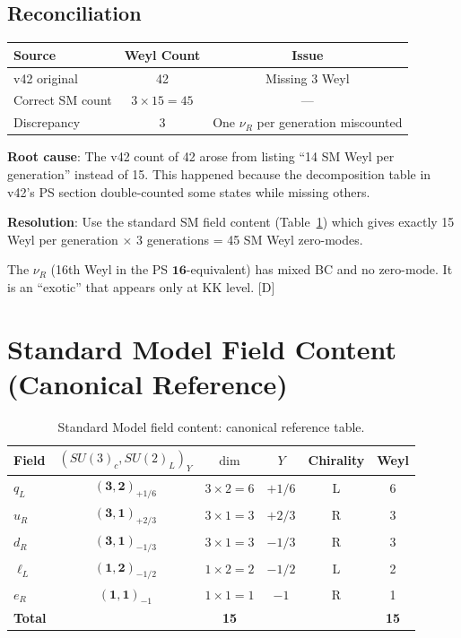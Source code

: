 \documentclass[11pt,a4paper]{article}
\newcommand{\tagD}{\textcolor{blue!70!black}{[D]}}
\begin{document}
\subsection{Reconciliation}

\begin{resultbox}[42 $\to$ 45 Reconciliation]
\begin{center}
\begin{tabular}{lcc}
\toprule
Source & Weyl Count & Issue \\
\midrule
v42 original & 42 & Missing 3 Weyl \\
Correct SM count & $3 \times 15 = 45$ & --- \\
\midrule
Discrepancy & 3 & One $\nu_R$ per generation miscounted \\
\bottomrule
\end{tabular}
\end{center}

\textbf{Root cause}: The v42 count of 42 arose from listing ``14 SM Weyl per generation''
instead of 15. This happened because the decomposition table in v42's PS section
double-counted some states while missing others.

\textbf{Resolution}: Use the standard SM field content (Table~\ref{tab:sm-fields-standard})
which gives exactly 15 Weyl per generation $\times$ 3 generations = 45 SM Weyl zero-modes.

The $\nu_R$ (16th Weyl in the PS $\mathbf{16}$-equivalent) has mixed BC and no zero-mode.
It is an ``exotic'' that appears only at KK level.
\tagD
\end{resultbox}

\section{Standard Model Field Content (Canonical Reference)}
\label{sec:sm-canonical}

\begin{table}[h]
\centering
\caption{Standard Model field content: canonical reference table.}
\label{tab:sm-fields-standard}
\begin{tabular}{lccccc}
\toprule
Field & $(SU(3)_c, SU(2)_L)_Y$ & $\dim$ & $Y$ & Chirality & Weyl \\
\midrule
$q_L$ & $(\mathbf{3}, \mathbf{2})_{+1/6}$ & $3 \times 2 = 6$ & $+1/6$ & L & 6 \\
$u_R$ & $(\mathbf{3}, \mathbf{1})_{+2/3}$ & $3 \times 1 = 3$ & $+2/3$ & R & 3 \\
$d_R$ & $(\mathbf{3}, \mathbf{1})_{-1/3}$ & $3 \times 1 = 3$ & $-1/3$ & R & 3 \\
$\ell_L$ & $(\mathbf{1}, \mathbf{2})_{-1/2}$ & $1 \times 2 = 2$ & $-1/2$ & L & 2 \\
$e_R$ & $(\mathbf{1}, \mathbf{1})_{-1}$ & $1 \times 1 = 1$ & $-1$ & R & 1 \\
\midrule
\textbf{Total} & & \textbf{15} & & & \textbf{15} \\
\bottomrule
\end{tabular}
\end{table}
\end{document}
